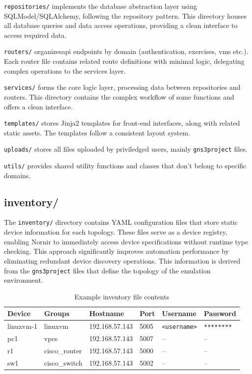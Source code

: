         \texttt{repositories/} implements the database abstraction layer using SQLModel/SQLAlchemy, following the repository 
        pattern. This directory houses all database queries and data access operations, providing a clean interface to access 
        required data.

        \texttt{routers/} organizes\ac{api} endpoints by domain (authentication, exercises, vms etc.). Each router file contains 
        related route definitions with minimal logic, delegating complex operations to the services layer.

        \texttt{services/} forms the core logic layer, processing data between repositories and routers. This directory 
        contains the complex workflow of some functions and offers a clean interface.

        \texttt{templates/} stores Jinja2 templates for front-end interfaces, along with related static assets. The 
        templates follow a consistent layout system.

        \texttt{uploads/} stores all files uploaded by priviledged users, mainly \texttt{gns3project} files.

        \texttt{utils/} provides shared utility functions and classes that don't belong to specific domains.

    \subsection{inventory/}
        The \texttt{inventory/} directory contains YAML configuration files that store static device information 
        for each topology. These files serve as a device registry, enabling Nornir to immediately access device 
        specifications without runtime type checking. This approach significantly improves automation performance 
        by eliminating redundant device discovery operations. This information is derived from the \texttt{gns3project} files 
        that define the topology of the emulation environment.

        \begin{table}[h]
            \centering
            \caption{Example inventory file contents}
            \label{tab:devices}
            \begin{tabular}{>{\ttfamily}llllll}
            \toprule
            \rowcolor{lightgray}
            \textrm{\normalfont Device} & \textrm{\normalfont Groups} & \textrm{\normalfont Hostname} & \textrm{\normalfont Port} & \textrm{\normalfont Username} & \textrm{\normalfont Password} \\
            \midrule
            linuxvm-1 & linuxvm & 192.168.57.143 & 5005 & \texttt{<username>} & \texttt{********} \\
            pc1 & vpcs & 192.168.57.143 & 5007 & -- & -- \\
            r1 & cisco\_router & 192.168.57.143 & 5000 & -- & -- \\
            sw1 & cisco\_switch & 192.168.57.143 & 5002 & -- & -- \\
            \bottomrule
            \end{tabular}
        \end{table}

